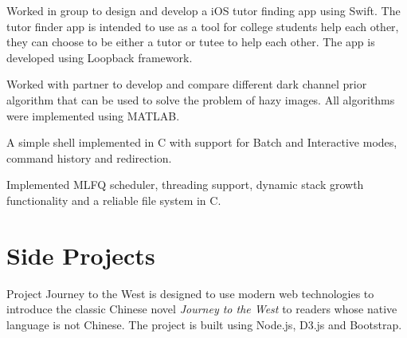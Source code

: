 \documentclass[]{deedy-resume-openfont}
\begin{document}
\begin{minipage}[t]{0.67\textwidth}
\descript{}
Worked in group to design and develop a iOS tutor finding app using Swift. The tutor finder app is intended to use as a tool for college students help each other, they can choose to be either a tutor or tutee to help each other. The app is developed using Loopback framework.
\sectionsep

\descript{}
Worked with partner to develop and compare different dark channel prior algorithm that can be used to solve the problem of hazy images. All algorithms were implemented using MATLAB.
\sectionsep

\descript{}
A simple shell implemented in C with support for Batch and Interactive modes, command history and redirection.
\sectionsep

\descript{}
Implemented MLFQ scheduler, threading support, dynamic stack growth functionality and a reliable file system in C.
\sectionsep

\iffalse
\runsubsection{Redesign Yahoo Finance}
\descript{}
\location{Mar 2014  - May 2014 }
Worked in a group to resigned the Yahoo Finance app and include the function of adding favorite stock.
\sectionsep
\fi

\iftrue
\section{Side Projects}

\descript{}
Project Journey to the West is designed to use modern web technologies to introduce the classic Chinese novel \textit{Journey to the West} to readers whose native language is not Chinese. The project is built using Node.js, D3.js and Bootstrap.  
\sectionsep
\fi


\end{minipage} 
\end{document}
